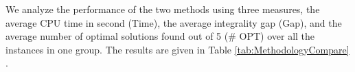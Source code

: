 \documentclass[11pt]{article}
\begin{document}
We analyze the performance of the two methods using three measures, the average CPU time in second (Time), the average integrality gap (Gap), and the average number of optimal solutions found out of 5 (\# OPT) over all the instances in one group.
The results are given in Table \ref{tab:MethodologyCompare} .

\begin{comment}

\begin{table}[]
\caption{Comparison of methodology to solve the model with the service level}
\label{tab:MethodologyCompare}
\begin{tabular}{lllllllllllll}
Method      & \multicolumn{4}{c}{Extensive form} & \multicolumn{4}{c}{Strong Cut}    & \multicolumn{4}{c}{Fast Cut}     \\ \hline
\# Branches & Time    & Gap   & \# Opt & BestObj & Time   & Gap   & \# Opt & BestObj & Time  & Gap   & \# Opt & BestObj \\ \hline
100         & 800.2   & 0.2\% & 4.8    & 10612.1 & 9.3    & 0.0\% & 5.0    & 10611.7 & 3.2   & 0.0\% & 5.0    & 10611.7 \\
200         & 2110.8  & 1.4\% & 4.1    & 10513.3 & 45.4   & 0.0\% & 5.0    & 10509.0 & 7.4   & 0.0\% & 5.0    & 10509.0 \\
300         & 3264.9  & 2.5\% & 3.2    & 10419.6 & 131.2  & 0.0\% & 5.0    & 10407.5 & 10.3  & 0.0\% & 5.0    & 10407.5 \\
500         & 4061.1  & 3.8\% & 2.5    & 10752.6 & 582.7  & 0.0\% & 5.0    & 10712.6 & 25.9  & 0.0\% & 5.0    & 10712.6 \\
1000        & 5321.6  & 7.5\% & 1.6    & 12369.2 & 3265.4 & 1.1\% & 4.0    & 10722.1 & 220.3 & 0.0\% & 4.9    & 10700.5 \\ \hline
Average     & 3111.7  & 3.1\% & 3.2    & 10933.4 & 806.8  & 0.2\% & 4.8    & 10592.6 & 53.4  & 0.0\% & 5.0    & 10588.3
\end{tabular}


\end{table}
\end{comment}
\end{document}
